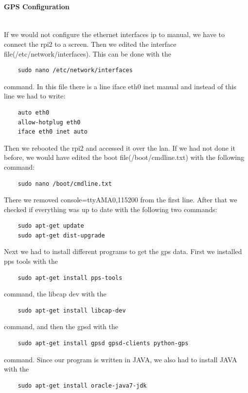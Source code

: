 \paragraph{GPS Configuration} \mbox{}\\
If we would not configure the ethernet interfaces \gls{ip} to manual, we have to connect the \gls{rpi2} to a screen. Then we edited the interface file(/etc/network/interfaces). This can be done with the 
\begin{verbatim}
	sudo nano /etc/network/interfaces
\end{verbatim}
command. \newline
In this file there is a line iface eth0 inet manual and instead of this line we had to write:
\begin{verbatim}
	auto eth0
	allow-hotplug eth0
	iface eth0 inet auto
\end{verbatim}
Then we rebooted the \gls{rpi2} and accessed it over the \gls{lan}. \newline
If we had not done it before, we would have edited the boot file(/boot/cmdline.txt) with the following command:
\begin{verbatim}
	sudo nano /boot/cmdline.txt
\end{verbatim}
There we removed console=ttyAMA0,115200 from the first line.\newline
After that we checked if everything was up to date with the following two commands:
\begin{verbatim}
	sudo apt-get update
	sudo apt-get dist-upgrade
\end{verbatim}
Next we had to install different programs to get the \gls{gps} data.\newline
First we installed pps tools with the 
\begin{verbatim}
	sudo apt-get install pps-tools
\end{verbatim}
command, the libcap dev with the 
\begin{verbatim}
	sudo apt-get install libcap-dev
\end{verbatim}
command, and then the \gls{gpsd} with the 
\begin{verbatim}
	sudo apt-get install gpsd gpsd-clients python-gps
\end{verbatim}
command.\newline
Since our program is written in JAVA, we also had to install JAVA with the 
\begin{verbatim}
	sudo apt-get install oracle-java7-jdk
\end{verbatim}
